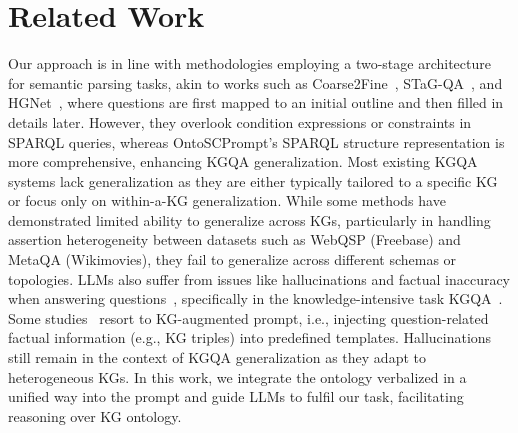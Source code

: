 \section{Related Work}
Our approach is in line with methodologies employing a two-stage architecture for semantic parsing tasks, akin to works such as Coarse2Fine~\cite{dong-lapata-2018-coarse}, STaG-QA~\cite{ravishankar-etal-2022-two}, and HGNet~\cite{10.1109/TKDE.2022.3207477}, where questions are first mapped to an initial outline and then filled in details later. However, they overlook condition expressions or constraints in SPARQL queries, whereas OntoSCPrompt's SPARQL structure representation is more comprehensive, enhancing KGQA generalization.
Most existing KGQA systems lack generalization as they are either typically tailored to a specific KG or focus only on within-a-KG generalization. While some methods have demonstrated limited ability to generalize across KGs, particularly in handling assertion heterogeneity between datasets such as WebQSP (Freebase) and MetaQA (Wikimovies), they fail to generalize across different schemas or topologies. LLMs also suffer from issues like hallucinations and factual inaccuracy when answering questions~\cite{10.1145/3571730}, specifically in the knowledge-intensive task KGQA~\cite{2023arXiv230307992T,2023arXiv230310368H}. Some studies~\cite{2023arXiv230911206W,baek-etal-2023-knowledge} resort to KG-augmented prompt, i.e., injecting question-related factual information (e.g., KG triples) into predefined templates. Hallucinations still remain in the context of KGQA generalization as they adapt to heterogeneous KGs. In this work, we integrate the ontology verbalized in a unified way into the prompt and guide LLMs to fulfil our task, facilitating reasoning over KG ontology.